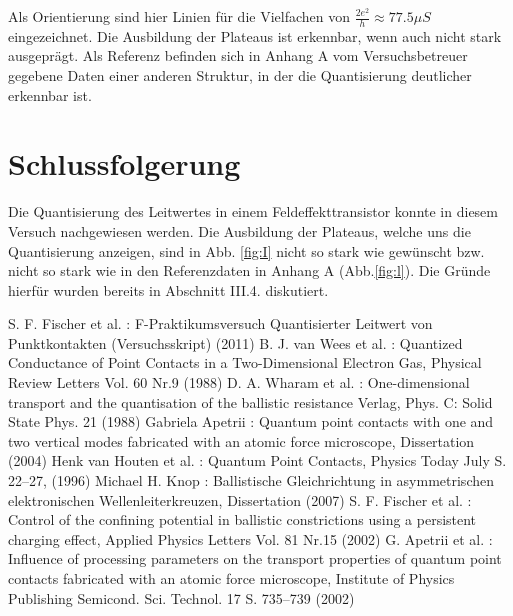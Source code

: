 \documentclass[aps,twocolumn,secnumarabic,nobalancelastpage,amsmath,amssymb,
nofootinbib,superscriptaddress]{revtex4-1}
\begin{document}
Als Orientierung sind hier Linien für die Vielfachen von $\frac{2e^2}{h} \approx 77.5 \mu S$
eingezeichnet. Die Ausbildung der Plateaus ist erkennbar, wenn auch nicht stark
ausgeprägt. Als Referenz befinden sich in Anhang A vom Versuchsbetreuer gegebene
Daten einer anderen Struktur, in der die Quantisierung deutlicher erkennbar ist.

\section{Schlussfolgerung}

Die Quantisierung des Leitwertes in einem Feldeffekttransistor
konnte in diesem Versuch nachgewiesen werden. Die Ausbildung der Plateaus, welche
uns die Quantisierung anzeigen, sind in Abb. \ref{fig:I} nicht so stark wie gewünscht
bzw. nicht so stark wie in den Referenzdaten in Anhang A (Abb.\ref{fig:l}). Die
Gründe hierfür wurden bereits in Abschnitt III.4. diskutiert.




\begin{thebibliography}{99}
S. F. Fischer et al. : F-Praktikumsversuch Quantisierter Leitwert von Punktkontakten (Versuchsskript) (2011)
B. J. van Wees et al. : Quantized Conductance of Point Contacts in a Two-Dimensional Electron Gas, Physical Review Letters Vol. 60 Nr.9 (1988)
D. A. Wharam et al. : One-dimensional transport and the quantisation of the ballistic resistance Verlag, Phys. C: Solid State Phys. 21  (1988)
Gabriela Apetrii : Quantum point contacts with one and two vertical modes fabricated with an atomic force microscope, Dissertation (2004)
Henk van Houten et al. :  Quantum Point Contacts, Physics Today July S. 22–27, (1996)
Michael H. Knop :  Ballistische Gleichrichtung in asymmetrischen elektronischen Wellenleiterkreuzen, Dissertation (2007)
S. F. Fischer et al. :  Control of the confining potential in ballistic constrictions using a persistent charging effect, Applied Physics Letters Vol. 81 Nr.15 (2002)
G. Apetrii et al. :  Influence of processing parameters on the transport properties of quantum point contacts fabricated with an atomic force microscope, Institute of Physics Publishing Semicond. Sci. Technol. 17 S. 735–739 (2002)
\end{thebibliography}
\end{document}
